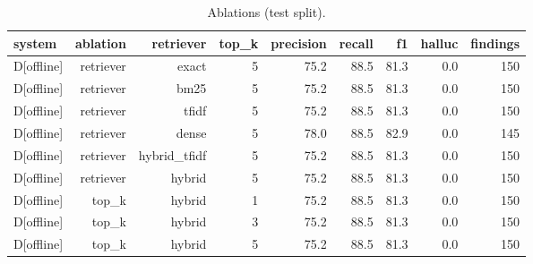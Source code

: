 \begin{table}[t]
\centering
\small
\caption{Ablations (test split).}
\label{tab:ablations-test}
\begin{tabular}{lrrrrrrrr}
\toprule
system & ablation & retriever & top\_k & precision & recall & f1 & halluc & findings \\
\midrule
D[offline] & retriever & exact & 5 & 75.2 & 88.5 & 81.3 & 0.0 & 150 \\
D[offline] & retriever & bm25 & 5 & 75.2 & 88.5 & 81.3 & 0.0 & 150 \\
D[offline] & retriever & tfidf & 5 & 75.2 & 88.5 & 81.3 & 0.0 & 150 \\
D[offline] & retriever & dense & 5 & 78.0 & 88.5 & 82.9 & 0.0 & 145 \\
D[offline] & retriever & hybrid\_tfidf & 5 & 75.2 & 88.5 & 81.3 & 0.0 & 150 \\
D[offline] & retriever & hybrid & 5 & 75.2 & 88.5 & 81.3 & 0.0 & 150 \\
D[offline] & top\_k & hybrid & 1 & 75.2 & 88.5 & 81.3 & 0.0 & 150 \\
D[offline] & top\_k & hybrid & 3 & 75.2 & 88.5 & 81.3 & 0.0 & 150 \\
D[offline] & top\_k & hybrid & 5 & 75.2 & 88.5 & 81.3 & 0.0 & 150 \\
\bottomrule
\end{tabular}
\end{table}
